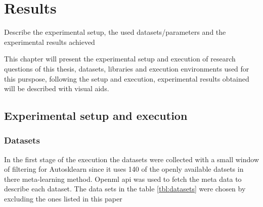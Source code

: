 \chapter{Results}\label{chap:results}


Describe the experimental setup, the used datasets/parameters and the experimental results achieved

This chapter will present the experimental setup and execution of research questions of this thesis, datasets, libraries and execution environments used for this purspose, following the setup and execution, experimental results obtained will be described with visual aids.

\section{Experimental setup and execution}
\subsection{Datasets}
In the first stage of the execution the datasets were collected with a small window of filtering for Autosklearn since it uses 140 of the openly available datsets in there meta-learning method. Openml\cite{OpenML2013} api was used to fetch the meta data to describe each dataset. The data sets in the table \ref{tbl:datasets} were chosen by excluding the ones listed in this paper\cite{autosklearn_supplementary}


